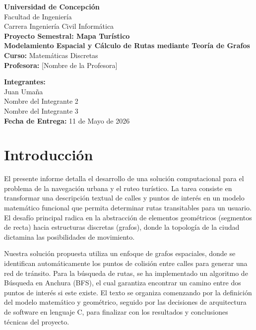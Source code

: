 \documentclass[12pt, a4paper]{article}
\begin{document}
\begin{titlepage}
    \centering
    {\Large \textbf{Universidad de Concepción}} \\[0.5cm]
    {\large Facultad de Ingeniería} \\[0.5cm] 
    {\large Carrera Ingeniería Civil Informática} \\[3cm]

    {\Huge \textbf{Proyecto Semestral: Mapa Turístico}} \\[1cm]
    {\Large \textbf{Modelamiento Espacial y Cálculo de Rutas mediante Teoría de Grafos}} \\[1cm]

    {\Large \textbf{Curso:} Matemáticas Discretas} \\[0.5cm]
    {\Large \textbf{Profesora:} [Nombre de la Profesora]} \\[2cm]

    \begin{flushright}
        \large
        \textbf{Integrantes:} \\ 
        Juan Umaña \\
        Nombre del Integrante 2 \\
        Nombre del Integrante 3 \\[1cm]
        \textbf{Fecha de Entrega:} 11 de Mayo de 2026
    \end{flushright}

    \vfill
\end{titlepage}

\setcounter{page}{1}


\section{Introducción}
El presente informe detalla el desarrollo de una solución computacional para el problema de la navegación urbana y el ruteo turístico. La tarea consiste en transformar una descripción textual de calles y puntos de interés en un modelo matemático funcional que permita determinar rutas transitables para un usuario. El desafío principal radica en la abstracción de elementos geométricos (segmentos de recta) hacia estructuras discretas (grafos), donde la topología de la ciudad dictamina las posibilidades de movimiento.

Nuestra solución propuesta utiliza un enfoque de grafos espaciales, donde se identifican automáticamente los puntos de colisión entre calles para generar una red de tránsito. Para la búsqueda de rutas, se ha implementado un algoritmo de Búsqueda en Anchura (BFS), el cual garantiza encontrar un camino entre dos puntos de interés si este existe. El texto se organiza comenzando por la definición del modelo matemático y geométrico, seguido por las decisiones de arquitectura de software en lenguaje C, para finalizar con los resultados y conclusiones técnicas del proyecto.
\end{document}
